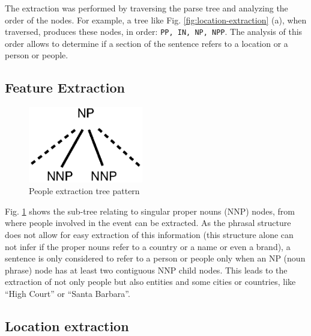 \documentclass{llncs}
\begin{document}
The extraction was performed by traversing the parse tree and analyzing the order of the nodes. For example, a tree like Fig. \ref{fig:location-extraction} (a), when traversed, produces these nodes, in order: \verb!PP, IN, NP, NPP!. The analysis of this order allows to determine if a section of the sentence refers to a location or a person or people.

\subsection{Feature Extraction}
\label{subsec:approach:entities-extraction}

\begin{figure}[h!]
	\centering
	\includegraphics[width=50mm]{dia/people.eps}
	\caption{People extraction tree pattern}
	\label{fig:people-extraction}
\end{figure}

Fig. \ref{fig:people-extraction} shows the sub-tree relating to singular proper nouns (NNP) nodes, from where people involved in the event can be extracted. As the phrasal structure does not allow for easy extraction of this information (this structure alone can not infer if the proper nouns refer to a country or a name or even a brand), a sentence is only considered to refer to a person or people only when an NP (noun phrase) node has at least two contiguous NNP child nodes. This leads to the extraction of not only people but also entities and some cities or countries, like ``High Court'' or ``Santa Barbara''.

\subsection{Location extraction}
\label{subsec:approach:location-extraction}
\end{document}
